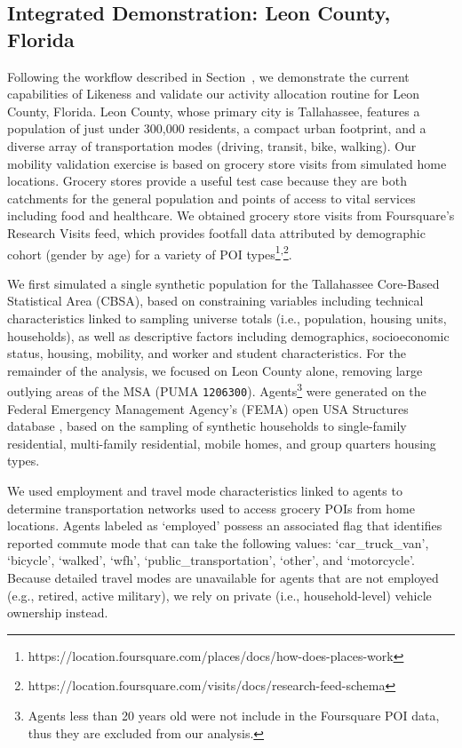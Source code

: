 \subsection{Integrated Demonstration: Leon County, Florida} \label{section:LCFL}

Following the workflow described in Section~, we demonstrate the current capabilities of Likeness and validate our activity allocation routine for Leon County, Florida. Leon County, whose primary city is Tallahassee, features a population of just under 300,000 residents, a compact urban footprint, and a diverse array of transportation modes (driving, transit, bike, walking). Our mobility validation exercise is based on grocery store visits from simulated home locations. Grocery stores provide a useful test case because they are both catchments for the general population and points of access to vital services including food and healthcare. We obtained grocery store visits from Foursquare's Research Visits feed, which provides footfall data attributed by demographic cohort (gender by age) for a variety of POI types\footnote{https://location.foursquare.com/places/docs/how-does-places-work}\textsuperscript{,}\footnote{https://location.foursquare.com/visits/docs/research-feed-schema}. 

We first simulated a single synthetic population for the Tallahassee Core-Based Statistical Area (CBSA), based on constraining variables including technical characteristics linked to sampling universe totals (i.e., population, housing units, households), as well as descriptive factors including demographics, socioeconomic status, housing, mobility, and worker and student characteristics. For the remainder of the analysis, we focused on Leon County alone, removing large outlying areas of the MSA (PUMA \texttt{1206300}). Agents\footnote{Agents less than 20 years old were not include in the Foursquare POI data, thus they are excluded from our analysis.} were generated on the Federal Emergency Management Agency's (FEMA) open USA Structures database \cite{yang2018building, usa_struct_2022}, based on the sampling of synthetic households to single-family residential, multi-family residential, mobile homes, and group quarters housing types.

We used employment and travel mode characteristics linked to agents to determine transportation networks used to access grocery POIs from home locations. Agents labeled as `employed' possess an associated flag that identifies reported commute mode that can take the following values: `car\_truck\_van', `bicycle', `walked', `wfh', `public\_transportation', `other', and `motorcycle'. Because detailed travel modes are unavailable for agents that are not employed (e.g., retired, active military), we rely on private (i.e., household-level) vehicle ownership instead.

